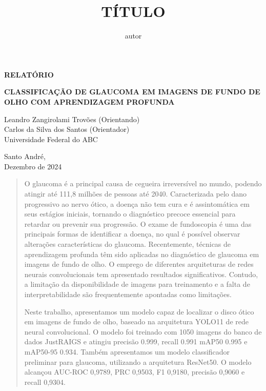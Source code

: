 \documentclass[12pt]{article}
\title{TÍTULO}
\author{autor}
\begin{document}
\thispagestyle{empty}
    \begin{flushright}
        \begin{huge}
            \textbf{RELATÓRIO}\\[3,5cm]
        \end{huge}
{\bf \LARGE  CLASSIFICAÇÃO DE GLAUCOMA EM IMAGENS DE FUNDO DE OLHO COM APRENDIZAGEM PROFUNDA}

\bigskip
        
        Leandro Zangirolami Trovões (Orientando)\\
        Carlos da Silva dos Santos (Orientador)\\
        Universidade Federal do ABC\\[5,5cm]
    \end{flushright}

    \vfill
    
    \begin{center}
        Santo André,\\
        Dezembro de 2024
    \end{center}
    
    \newpage
\bigskip

\begin{center}
\end{center}

\begin{quote}
O glaucoma é a principal causa de cegueira irreversível no mundo, podendo atingir até 111,8 milhões de pessoas até 2040. Caracterizada pelo dano progressivo ao nervo ótico, a doença não tem cura e é assintomática em seus estágios iniciais, tornando o diagnóstico precoce essencial para retardar ou prevenir sua progressão. O exame de fundoscopia é uma das principais formas de identificar a doença, no qual é possível observar alterações características do glaucoma. Recentemente, técnicas de aprendizagem profunda têm sido aplicadas no diagnóstico de glaucoma em imagens de fundo de olho. O emprego de diferentes arquiteturas de redes neurais convolucionais tem apresentado resultados significativos. Contudo, a limitação da disponibilidade de imagens para treinamento e a falta de interpretabilidade são frequentemente apontadas como limitações.

Neste trabalho, apresentamos um modelo capaz de localizar o disco ótico em imagens de fundo de olho, baseado na arquitetura YOLO11 de rede neural convolucional. O modelo foi treinado com 1050 imagens do banco de dados JustRAIGS e atingiu precisão 0.999, recall 0.991 mAP50 0.995 e mAP50-95 0.934. Também apresentamos um modelo classificador preliminar para glaucoma, utilizando a arquitetura ResNet50. O modelo alcançou AUC-ROC 0,9789, PRC 0,9503, F1 0,9180, precisão 0,9060 e recall 0,9304.

\end{quote}
\end{document}
